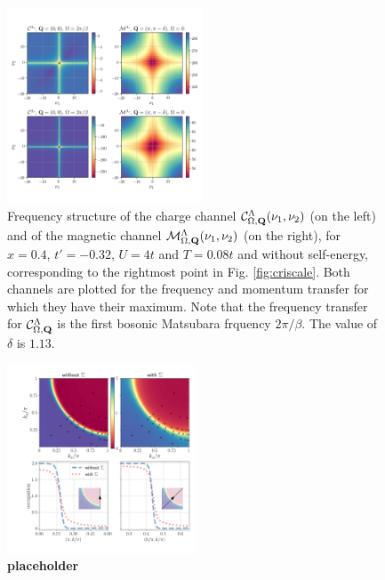 \begin{figure}
\hspace*{-1.0cm}
\includegraphics[width=0.52\textwidth]{images/Phi_color_all.png}
\caption{Frequency structure of the charge channel $\mathcal{C}^\Lambda_{\Omega,\mathbf{Q}}(\nu_1,\nu_2)$ (on the left) and of the magnetic channel $\mathcal{M}^\Lambda_{\Omega,\mathbf{Q}}(\nu_1,\nu_2)$ (on the right), for $x=0.4$, $t'=-0.32$, $U=4t$ and $T=0.08t$ and without self-energy, corresponding to the rightmost point in Fig. \ref{fig:criscale}. 
Both channels are plotted for the frequency and momentum transfer for which they have their maximum. Note that the frequency transfer for $\mathcal{C}^\Lambda_{\Omega,\mathbf{Q}}$ is the first bosonic Matsubara frquency $2\pi/\beta$. 
The value of $\delta$ is $1.13$.  
 }  
\label{fig:freqplot} 
\end{figure}


\begin{figure}
\includegraphics[width=0.5\textwidth]{images/occupations_0975.png}
\caption{\textbf{placeholder}} 
\label{fig:occupation}
\end{figure}

